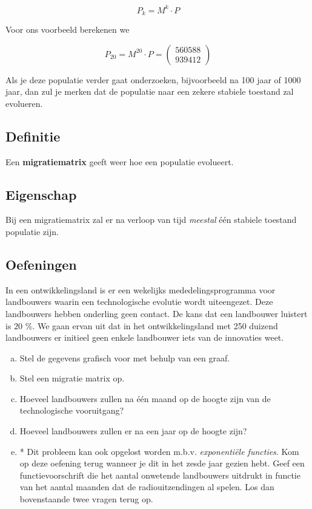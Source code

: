 \documentclass[12pt,twoside]{article}
\begin{document}
$$ P_k = M^k \cdot P $$

Voor ons voorbeeld berekenen we

\[P_{20} = M^{20} \cdot P = \begin{pmatrix}560588\\939412\end{pmatrix}\]

Als je deze populatie verder gaat onderzoeken, bijvoorbeeld na 100 jaar of 1000 jaar, dan zul je merken dat de populatie naar een zekere stabiele toestand zal evolueren.

\subsection{Definitie}

Een {\bf migratiematrix} geeft weer hoe een populatie evolueert.

\subsection{Eigenschap}

Bij een migratiematrix zal er na verloop van tijd {\em meestal} één stabiele toestand populatie zijn.

\subsection{Oefeningen}


\begin{oefening}
In een ontwikkelingsland is er een wekelijks mededelingsprogramma voor landbouwers waarin een technologische evolutie wordt uiteengezet. Deze landbouwers hebben onderling geen contact. De kans dat een landbouwer luistert is $20$ \%. We gaan ervan uit dat in het ontwikkelingsland met 250 duizend landbouwers er initieel geen enkele landbouwer iets van de innovaties weet.

\begin{enumerate}[(a)]
  \item Stel de gegevens grafisch voor met behulp van een graaf.
  \item Stel een migratie matrix op.
  \item Hoeveel landbouwers zullen na één maand op de hoogte zijn van de technologische vooruitgang?
  \item Hoeveel landbouwers zullen er na een jaar op de hoogte zijn?
  \item * Dit probleem kan ook opgelost worden m.b.v. {\em exponentiële functies}. Kom op deze oefening terug wanneer je dit in het zesde jaar gezien hebt. Geef een functievoorschrift die het aantal onwetende landbouwers uitdrukt in functie van het aantal maanden dat de radiouitzendingen al spelen. Los dan bovenstaande twee vragen terug op.
\end{enumerate}
\end{oefening}
\end{document}

